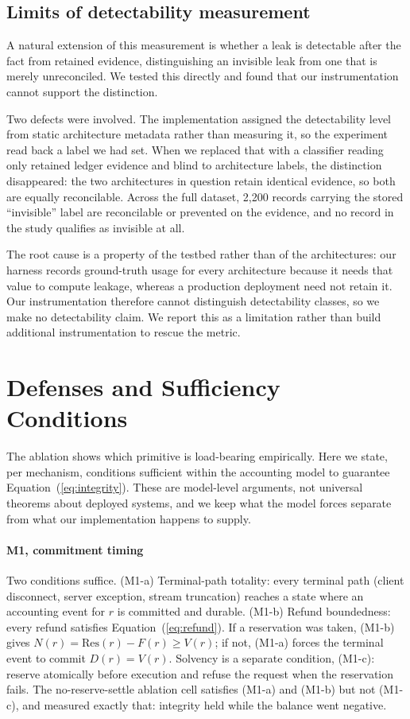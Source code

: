 \documentclass[manuscript,review]{acmart}
\begin{document}
\subsection{Limits of detectability measurement}
\label{sec:detect}
A natural extension of this measurement is whether a leak is detectable after the fact
from retained evidence, distinguishing an invisible leak from one that is merely
unreconciled. We tested this directly and found that our instrumentation cannot support
the distinction.

Two defects were involved. The implementation assigned the detectability level from
static architecture metadata rather than measuring it, so the experiment read back a
label we had set. When we replaced that with a classifier reading only retained ledger
evidence and blind to architecture labels, the distinction disappeared: the two
architectures in question retain identical evidence, so both are equally reconcilable.
Across the full dataset, 2{,}200 records carrying the stored ``invisible'' label are
reconcilable or prevented on the evidence, and no record in the study qualifies as
invisible at all.

The root cause is a property of the testbed rather than of the architectures: our
harness records ground-truth usage for every architecture because it needs that value to
compute leakage, whereas a production deployment need not retain it. Our instrumentation
therefore cannot distinguish detectability classes, so we make no detectability claim. We
report this as a limitation rather than build additional instrumentation to rescue the
metric.

\section{Defenses and Sufficiency Conditions}
\label{sec:sufficiency}
The ablation shows which primitive is load-bearing empirically. Here we state, per
mechanism, conditions sufficient within the accounting model to guarantee
Equation~(\ref{eq:integrity}). These are model-level arguments, not universal theorems
about deployed systems, and we keep what the model forces separate from what our
implementation happens to supply.

\paragraph{M1, commitment timing}
Two conditions suffice. (M1-a) Terminal-path totality: every terminal path (client
disconnect, server exception, stream truncation) reaches a state where an accounting
event for $r$ is committed and durable. (M1-b) Refund boundedness: every refund satisfies
Equation~(\ref{eq:refund}). If a reservation was taken, (M1-b) gives $N(r) =
\mathrm{Res}(r) - F(r) \ge V(r)$; if not, (M1-a) forces the terminal event to commit
$D(r) = V(r)$. Solvency is a separate condition, (M1-c): reserve atomically before
execution and refuse the request when the reservation fails. The no-reserve-settle
ablation cell satisfies (M1-a) and (M1-b) but not (M1-c), and measured exactly that:
integrity held while the balance went negative.
\end{document}
